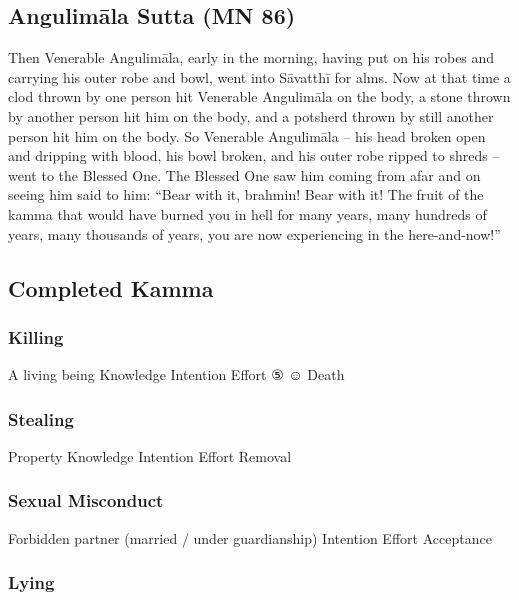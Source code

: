 \documentclass[a4 paper, 12pt]{article}
\begin{document}
\newpage

\subsection*{Angulimāla Sutta (MN 86)}

Then Venerable Angulimāla, early in the morning, having put on his robes and carrying his outer robe and bowl, went into Sāvatthī for alms. Now at that time a clod thrown by one person hit Venerable Angulimāla on the body, a stone thrown by another person hit him on the body, and a potsherd thrown by still another person hit him on the body. So Venerable Angulimāla – his head broken open and dripping with blood, his bowl broken, and his outer robe ripped to shreds – went to the Blessed One. The Blessed One saw him coming from afar and on seeing him said to him: “Bear with it, brahmin! Bear with it! The fruit of the kamma that would have burned you in hell for many years, many hundreds of years, many thousands of years, you are now experiencing in the here-and-now!”

\subsection*{Completed Kamma}

\subsubsection*{Killing}
 A living being  Knowledge  Intention  Effort  ⑤ ☺ Death

\subsubsection*{Stealing}
 Property  Knowledge  Intention  Effort  Removal

\subsubsection*{Sexual Misconduct}

 Forbidden partner (married / under guardianship)  Intention  Effort  Acceptance

\subsubsection*{Lying}
\end{document}
